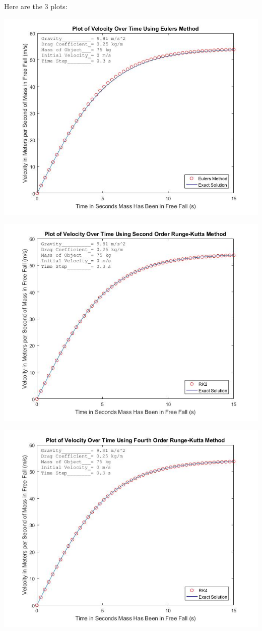 \documentclass[12pt]{article}
\begin{document}
Here are the 3 plots:

\includegraphics[scale=0.5]{EulersMethodPlot}

\includegraphics[scale=0.5]{RK2Plot}

\includegraphics[scale=0.5]{RK4Plot}
\end{document}
